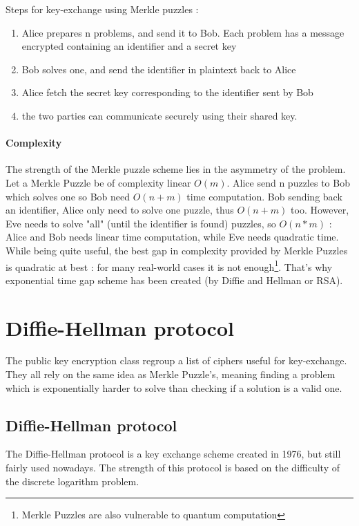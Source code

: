 Steps for key-exchange using Merkle puzzles :
\begin{enumerate}
	\item Alice prepares n problems, and send it to Bob. Each problem has a message encrypted containing an identifier and a secret key
	\item Bob solves one, and send the identifier in plaintext back to Alice
	\item Alice fetch the secret key corresponding to the identifier sent by Bob
	\item the two parties can communicate securely using their shared key.
\end{enumerate}

\paragraph{Complexity}

The strength of the Merkle puzzle scheme lies in the asymmetry of the problem. Let a Merkle Puzzle be of complexity linear $O(m)$.  Alice send n puzzles to Bob which solves one so Bob need $O(n+m)$ time computation. Bob sending back an identifier, Alice only need to solve one puzzle, thus $O(n+m)$ too. However, Eve needs to solve "all" (until the identifier is found) puzzles, so $O(n*m)$ : Alice and Bob needs linear time computation, while Eve needs quadratic time.\\

While being quite useful, the best gap in complexity provided by Merkle Puzzles is quadratic at best : for many real-world cases it is not enough\footnote{Merkle Puzzles are also vulnerable to quantum computation}. That's why exponential time gap scheme has been created (by Diffie and Hellman or RSA). 

\section{Diffie-Hellman protocol}

The public key encryption class regroup a list of ciphers useful for key-exchange. They all rely on the same idea as Merkle Puzzle's, meaning finding a problem which is exponentially harder to solve than checking if a solution is a valid one.


\subsection{Diffie-Hellman protocol}
The Diffie-Hellman protocol is a key exchange scheme created in 1976, but still fairly used nowadays.  The strength of this protocol is based on the difficulty of the discrete logarithm problem. 

